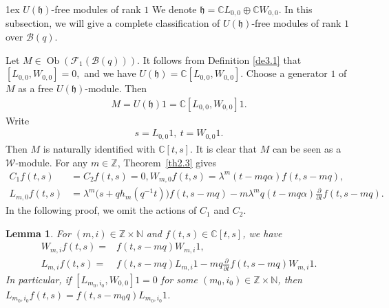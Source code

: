 \documentclass[a4paper]{amsart}
\makeatletter
\numberwithin{equation}{section}
\newtheorem{lemma}[theorem]{Lemma}
\def\subsection{\@startsection{subsection}{2}%
  \z@{1.5ex \@plus .5ex \@minus .2ex}%
  {1ex}%
  {\normalfont\bfseries}}
\makeatother
\begin{document}
\subsection{$U(\mathfrak{h})$-free modules of rank $1$}
We denote $\mathfrak{h}=\mathbb{C}L_{0,0}\oplus\mathbb{C}W_{0,0}$. In this subsection, we will give a complete classification of $U(\mathfrak{h})$-free modules of rank $1$ over $\mathcal{B}(q)$.

Let $M\in\operatorname{Ob}(\mathcal F_1(\mathcal B(q)))$.
It follows from Definition \ref{de3.1} that 
$
[L_{0,0},W_{0,0}]=0,
$
and we have $U(\mathfrak{h})=\mathbb{C}[L_{0,0},W_{0,0}]$. Choose a generator $1$ of $M$ as a free $U(\mathfrak h)$-module. Then
\begin{align*}
M=U(\mathfrak h) 1=\mathbb C[L_{0,0},W_{0,0}] 1.
\end{align*}
Write
\begin{align*}
s=L_{0,0} 1,\  t=W_{0,0} 1.
\end{align*}
Then $M$ is naturally identified with $\mathbb C[t,s]$.
It is clear that $M$ can be seen as a $\mathcal{W}$-module.
    For any $m\in\mathbb{Z}$, Theorem~\ref{th2.3} gives
    \begin{equation}\label{action}
    \begin{aligned}
    C_{1} f(t,s)&=C_{2} f(t,s)=0, 
    W_{m,0} f(t,s)
     =\lambda^{m}(t-mq\alpha)f(t,s-mq),\\
    L_{m,0} f(t,s)
    &=\lambda^{m}\bigl(s+q h_{m}(q^{-1}t)\bigr)f(t,s-mq)  -m\lambda^{m}q(t-m q\alpha)\frac{\partial}{\partial t}f(t,s-mq).
    \end{aligned}
    \end{equation}
    In the following proof, we omit the actions of $C_1$ and $C_2$.
 \begin{lemma}\label{lem3.2}
 For $(m,i)\in \mathbb{Z}\times \mathbb{N}$ and $f(t,s)\in\mathbb{C}[t,s]$, we have 
 \begin{align}
        W_{m,i} f(t,s)=&f(t,s-mq)W_{m,i}1,\label{3.2}\\
        L_{m,i} f(t,s)=&f(t,s-mq)L_{m,i} 1 -mq\frac{\partial}{\partial t}f(t,s-mq)W_{m,i}1.\label{3.3}
 \end{align}
    In particular, if $[L_{m_{0},i_{0}},W_{0,0}] 1=0$ for some  $(m_{0},i_{0})\in \mathbb{Z}\times \mathbb{N}$, then $L_{m_{0},i_{0}} f(t,s)=f(t,s-m_{0}q)L_{m_{0},i_{0}}1$.
 \end{lemma}
\end{document}
